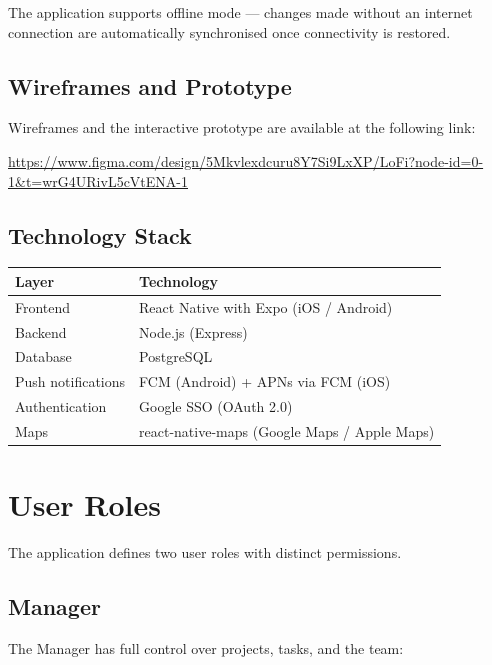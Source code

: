 \documentclass[12pt,a4paper]{article}
\begin{document}
The application supports offline mode --- changes made without an internet connection are automatically synchronised once connectivity is restored.

\subsection*{Wireframes and Prototype}

Wireframes and the interactive prototype are available at the following link:\\
\begin{sloppypar}
\url{https://www.figma.com/design/5Mkvlexdcuru8Y7Si9LxXP/LoFi?node-id=0-1&t=wrG4URivL5cVtENA-1}
\end{sloppypar} %

\subsection*{Technology Stack}
 
\begin{tabular}{ll}
\toprule
\textbf{Layer} & \textbf{Technology} \\
\midrule
Frontend           & React Native with Expo (iOS / Android) \\
Backend            & Node.js (Express) \\
Database           & PostgreSQL \\
Push notifications & FCM (Android) + APNs via FCM (iOS) \\
Authentication     & Google SSO (OAuth 2.0) \\
Maps               & react-native-maps (Google Maps / Apple Maps) \\
\bottomrule
\end{tabular}

\section{User Roles}

The application defines two user roles with distinct permissions.

\subsection{Manager}

The Manager has full control over projects, tasks, and the team:
\end{document}
